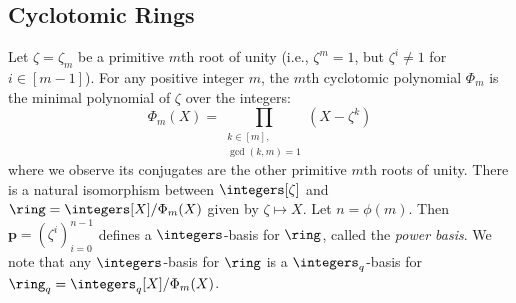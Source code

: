 \subsection{Cyclotomic Rings}
\label{sec:rings}



Let $\zeta = \zeta_m$ be a primitive $m$th root of unity (i.e., $\zeta^m = 1$, but $\zeta^i \neq 1$ for $i \in [m-1]$). For any positive integer $m$, the $m$th cyclotomic polynomial $\Phi_m$ is the minimal polynomial of $\zeta$ over the integers:
\[
  \Phi_m(X) = \prod_{\substack{k \in [m], \\ \gcd(k,m) = 1}} \left(X - \zeta^k\right)
\]
where we observe its conjugates are the other primitive $m$th roots of unity. There is a natural isomorphism between $\integers[\zeta]$ and $\ring = \integers[X]/\Phi_m(X)$ given by $\zeta \mapsto X$. Let $n = \phi(m)$. Then $\bm{p} = (\zeta^i)_{i=0}^{n-1}$ defines a $\integers$-basis for $\ring$, called the \emph{power basis}. We note that any $\integers$-basis for $\ring$ is a $\integers_q$-basis for $\ring_q = \integers_q[X]/\Phi_m(X)$.

